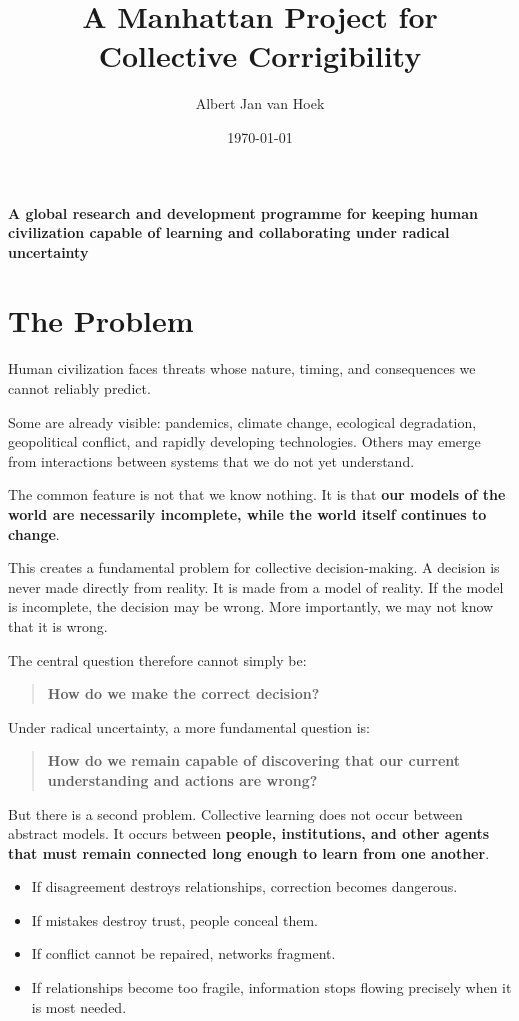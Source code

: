 \documentclass{article}
\title{A Manhattan Project for Collective Corrigibility}
\author{Albert Jan van Hoek}
\date{\today}
\begin{document}
\maketitle

\begin{center}
    \textbf{A global research and development programme for keeping human civilization capable of learning and collaborating under radical uncertainty}
\end{center}

\section{The Problem}
Human civilization faces threats whose nature, timing, and consequences we cannot reliably predict.

Some are already visible: pandemics, climate change, ecological degradation, geopolitical conflict, and rapidly developing technologies. Others may emerge from interactions between systems that we do not yet understand.

The common feature is not that we know nothing. It is that \textbf{our models of the world are necessarily incomplete, while the world itself continues to change}.

This creates a fundamental problem for collective decision-making. A decision is never made directly from reality. It is made from a model of reality. If the model is incomplete, the decision may be wrong. More importantly, we may not know that it is wrong.

The central question therefore cannot simply be:
\begin{quote}
    \textbf{How do we make the correct decision?}
\end{quote}

Under radical uncertainty, a more fundamental question is:
\begin{quote}
    \textbf{How do we remain capable of discovering that our current understanding and actions are wrong?}
\end{quote}

But there is a second problem. Collective learning does not occur between abstract models. It occurs between \textbf{people, institutions, and other agents that must remain connected long enough to learn from one another}.

\begin{itemize}
    \item If disagreement destroys relationships, correction becomes dangerous.
    \item If mistakes destroy trust, people conceal them.
    \item If conflict cannot be repaired, networks fragment.
    \item If relationships become too fragile, information stops flowing precisely when it is most needed.
\end{itemize}
\end{document}
